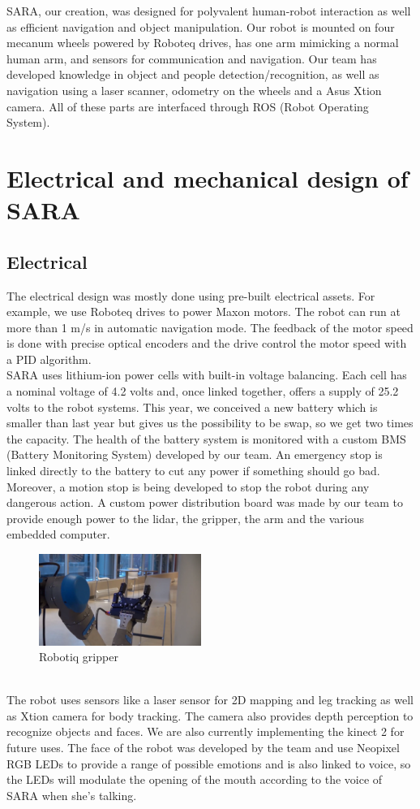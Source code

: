 \documentclass[runningheads,a4paper]{llncs}
\begin{document}
SARA, our creation, was designed for polyvalent human-robot interaction as well as efficient navigation and object manipulation. Our robot is mounted on four mecanum wheels powered by Roboteq drives, has one arm mimicking a normal human arm, and sensors for communication and navigation. Our team has developed knowledge in object and people detection/recognition, as well as navigation using a laser scanner, odometry on the wheels and a Asus Xtion camera. All of these parts are interfaced through ROS (Robot Operating System). \\

\section{Electrical and mechanical design of SARA}
\subsection{Electrical}
\tab The electrical design was mostly done using pre-built electrical assets. For example, we use Roboteq drives to power Maxon motors. The robot can run at more than 1 m/s in automatic navigation mode. The feedback of the motor speed is done with precise optical encoders and the drive control the motor speed with a PID algorithm. \\

SARA uses lithium-ion power cells with built-in voltage balancing. Each cell has a nominal voltage of 4.2 volts and, once linked together, offers a supply of 25.2 volts to the robot systems. This year, we conceived a new battery which is smaller than last year but gives us the possibility to be swap, so we get two times the capacity. The health of the battery system is monitored with a custom BMS (Battery Monitoring System) developed by our team. An emergency stop is linked directly to the battery to cut any power if something should go bad. Moreover, a motion stop is being developed to stop the robot during any dangerous action. A custom power distribution board was made by our team to provide enough power to the lidar, the gripper, the arm and the various embedded computer. \\
\begin{figure}
  \centering
  \includegraphics[width=150pt]{images/robotiq.png}
  \caption{Robotiq gripper}
\end{figure}\\
The robot uses sensors like a laser sensor for 2D mapping and leg tracking as well as Xtion camera for body tracking. The camera also provides depth perception to recognize objects and faces. We are also currently implementing the kinect 2 for future uses. The face of the robot was developed by the team and use Neopixel RGB LEDs to provide a range of possible emotions and is also linked to voice, so the LEDs will modulate the opening of the mouth according to the voice of SARA when she's talking. 
\end{document}
